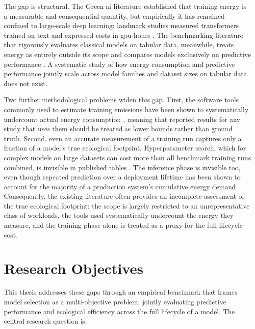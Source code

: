 The gap is structural. The Green \gls{ai} literature established that training energy is a measurable and consequential quantity, but empirically it has remained confined to large-scale deep learning: landmark studies measured transformers trained on text and expressed costs in \gls{gpu}-hours \parencite{strubellEnergyPolicyConsiderations2019a, dodgeMeasuringCarbonIntensity2022}. The benchmarking literature that rigorously evaluates classical models on tabular data, meanwhile, treats energy as entirely outside its scope and compares models exclusively on predictive performance \parencite{grinsztajnWhyTreebasedModels2022a, gorishniyRevisitingDeepLearning2021a}. A systematic study of how energy consumption and predictive performance jointly scale across model families and dataset sizes on tabular data does not exist.

Two further methodological problems widen this gap. First, the software tools commonly used to estimate training emissions have been shown to systematically undercount actual energy consumption \parencite{rodriguezEvaluatingEnergyConsumption2024, fischerGroundTruthingAIEnergy2025}, meaning that reported results for any study that uses them should be treated as lower bounds rather than ground truth. Second, even an accurate measurement of a training run captures only a fraction of a model's true ecological footprint. Hyperparameter search, which for complex models on large datasets can cost more than all benchmark training runs combined, is invisible in published tables \parencite{strubellEnergyPolicyConsiderations2019a}. The inference phase is invisible too, even though repeated prediction over a deployment lifetime has been shown to account for the majority of a production system's cumulative energy demand \parencite{desislavovTrendsAIInference2023}. Consequently, the existing literature often provides an incomplete assessment of the true ecological footprint: the scope is largely restricted to an unrepresentative class of workloads, the tools used systematically undercount the energy they measure, and the training phase alone is treated as a proxy for the full lifecycle cost.


\section{Research Objectives}
\label{sec:intro_objectives}

This thesis addresses these gaps through an empirical benchmark that frames model selection as a multi-objective problem, jointly evaluating predictive performance and ecological efficiency across the full lifecycle of a model. The central research question is:

